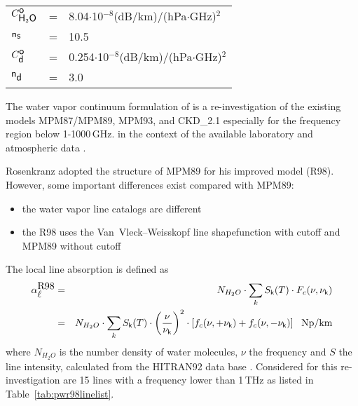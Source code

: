 {\begin{tabular}{lcl}
$C^{\mbox{\sf o}}_{\mbox{\sf H}_{2}\mbox{\sf O}}$   & = & 8.04$\cdot$10$^{-8}$(dB/km)/(hPa$\cdot$GHz)$^2$\\
${\sf n}_{\mbox{\sf s}}$    & = & 10.5\\
$C^{\mbox{\sf o}}_{\mbox{\sf d}}$   & = & 0.254$\cdot$10$^{-8}$(dB/km)/(hPa$\cdot$GHz)$^2$\\
${\sf n}_{\mbox{\sf d}}$    & = & 3.0\\
\end{tabular}




\label{leveld:pwr98_h2o}
The water vapor continuum formulation of \citet{pwr:98} is a re-investigation 
of the existing models MPM87/MPM89, MPM93, and CKD\_2.1 especially for 
the frequency region below 1-1000\,GHz. in the context of the available
laboratory and atmospheric data \citep{abaueretal:89, abaueretal:93, 
abaueretal:95, beckerautler:46, englishetal:94, godonetal:92,
liebe:84, liebeandlayton:87, westwateretal:90}.

Rosenkranz adopted the structure of MPM89 for his improved model (R98). 
However, some important differences exist compared with MPM89:
\begin{itemize}
\item the water vapor line catalogs are different 
\item the R98 uses the Van~Vleck--Weisskopf line shapefunction with 
      cutoff and MPM89 without cutoff
\end{itemize}


\label{levele:pwr98_h2oline}
The local line absorption is defined as 
\begin{eqnarray} 
 \label{eq:pwr98absline}
 \alpha^{\mbox{\rm R98}}_{\mbox{$\ell$}} &=& N_{H_2O} \cdot \sum_k S_{\sf k}(T) \cdot F_{c}(\nu,\nu_{\sf k}) \nonumber\\
            &=& N_{H_2O} \cdot \sum_k S_{\sf k}(T) \cdot 
                \left (\displaystyle{\frac{\nu}{\nu_{\sf k}}}\right )^2  \cdot 
                \left [f_{c}(\nu,+\nu_{\sf k}) + f_{c}(\nu,-\nu_{\sf k}) \right]~~\mbox{Np/km}
\end{eqnarray}
where $N_{H_2O}$ is the number density of water molecules, $\nu$ the
frequency and $S$ the line intensity, calculated from the HITRAN92
data base \citet{rothman:92}. Considered for this re-investigation are 
15 lines with a frequency lower than 1\,THz as listed in 
Table~\ref{tab:pwr98linelist}.

}
